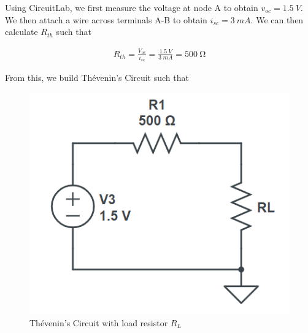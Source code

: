 \documentclass[12pt]{article}
\begin{document}
Using CircuitLab, we first measure the voltage at node A to obtain $v_{oc} = \SI{1.5}{V}$. We then attach a wire across terminals A-B to obtain $i_{sc} = \SI{3}{mA}$. We can then calculate $R_{th}$ such that

\begin{equation}
    \begin{split}
        R_{th} = \frac{V_{oc}}{i_{sc}} = \frac{\SI{1.5}{V}}{\SI{3}{mA}} = \SI{500}{\ohm}
    \end{split}
\end{equation}

From this, we build Thévenin's Circuit such that

\begin{figure}[H]
    \begin{center}
        \includegraphics[scale=0.7]{circuit-2.png}
        \caption { Thévenin's Circuit with load resistor $R_L$}
    \end{center}
\end{figure}
\end{document}
